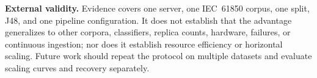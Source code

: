 \textbf{External validity.} Evidence covers one server, one IEC~61850 corpus, one split, J48, and one pipeline configuration. It does not establish that the advantage generalizes to other corpora, classifiers, replica counts, hardware, failures, or continuous ingestion; nor does it establish resource efficiency or horizontal scaling. Future work should repeat the protocol on multiple datasets and evaluate scaling curves and recovery separately.

